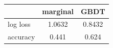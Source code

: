 \begin{tabular}{lcc}
\toprule
 & marginal & GBDT \\
\midrule
log loss & 1.0632 & 0.8432 \\
accuracy & 0.441 & 0.624 \\
\bottomrule
\end{tabular}
